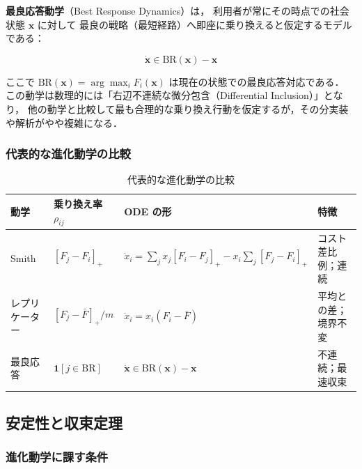 \textbf{最良応答動学}（Best Response Dynamics）は，
利用者が常にその時点での社会状態 $\boldsymbol{x}$ に対して
最良の戦略（最短経路）へ即座に乗り換えると仮定するモデルである：

\begin{equation}
  \dot{\boldsymbol{x}} \in \mathrm{BR}(\boldsymbol{x}) - \boldsymbol{x}
  \label{eq:best-response}
\end{equation}

ここで $\mathrm{BR}(\boldsymbol{x}) = \arg\max_i F_i(\boldsymbol{x})$
は現在の状態での最良応答対応である．
この動学は数理的には「右辺不連続な微分包含（Differential Inclusion）」となり，
他の動学と比較して最も合理的な乗り換え行動を仮定するが，その分実装や解析がやや複雑になる．

\subsubsection*{代表的な進化動学の比較}

\begin{table}[hbtp]
  \centering
  \caption{代表的な進化動学の比較}
  \label{tab:dynamics-comparison}
  \begin{tabular}{llll}
    \toprule
    動学 & 乗り換え率 $\rho_{ij}$ & ODE の形 & 特徴 \\
    \midrule
    Smith & $[F_j - F_i]_+$ &
      $\dot{x}_i = \sum_j x_j[F_i\!-\!F_j]_+ - x_i\!\sum_j [F_j\!-\!F_i]_+$ &
      コスト差比例；連続 \\[2pt]
    レプリケーター & $[F_j - \bar{F}]_+/m$ &
      $\dot{x}_i = x_i(F_i - \bar{F})$ &
      平均との差；境界不変 \\[2pt]
    最良応答 & $\mathbf{1}[j \in \mathrm{BR}]$ &
      $\dot{\boldsymbol{x}} \in \mathrm{BR}(\boldsymbol{x}) - \boldsymbol{x}$ &
      不連続；最速収束 \\
    \bottomrule
  \end{tabular}
\end{table}

\subsection{安定性と収束定理}
\label{subsec:stability-convergence}

\subsubsection*{進化動学に課す条件}

